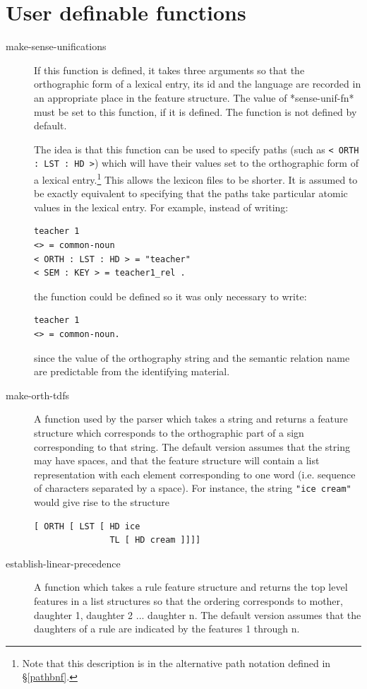 \documentclass[12pt]{report}
\begin{document}
\section{User definable functions}
\label{userfns}

\begin{description}
\item [make-sense-unifications] If this
function is defined, it takes 
three arguments so that the orthographic form of a lexical
entry, its id and the language are recorded in an appropriate place in
the feature structure.  The value of *sense-unif-fn* must be
set to this function, if it is defined.
The function is not defined by default.

The idea is that this function can be used to specify paths 
(such as \verb+< ORTH : LST : HD >+) which will have their values set to
the orthographic form of a lexical entry.\footnote{Note that
this description is in the alternative path notation defined
in \S\ref{pathbnf}.}
This allows the lexicon files to be shorter.
It is assumed to be exactly equivalent to specifying that the paths take
particular atomic values in the lexical entry.
For example, instead of writing:
\begin{verbatim}
teacher 1 
<> = common-noun
< ORTH : LST : HD > = "teacher"
< SEM : KEY > = teacher1_rel .
\end{verbatim}
the function could be defined so it was only necessary to write:
\begin{verbatim}
teacher 1 
<> = common-noun.
\end{verbatim}
since the value of the orthography string and the semantic relation name are
predictable from the identifying material.


\item[make-orth-tdfs] A function used by the parser
which takes a string and returns a 
feature structure which corresponds to the orthographic part of a sign
corresponding to that string.  The default version assumes that the string may 
have spaces, and that the feature structure will contain a list
representation with each element corresponding to one word (i.e. sequence of
characters separated by a space).  For instance, the string 
\verb+"ice cream"+ would give rise to the structure
\begin{verbatim}
[ ORTH [ LST [ HD ice
               TL [ HD cream ]]]]
\end{verbatim}

\item [establish-linear-precedence] A function which takes a rule 
feature structure and returns the top level features in a list
structures so that the ordering corresponds to mother, daughter 1,
daughter 2 ... daughter n.  The default version assumes that the daughters
of a rule are indicated by the features 1 through n.


\end{description}
\end{document}
